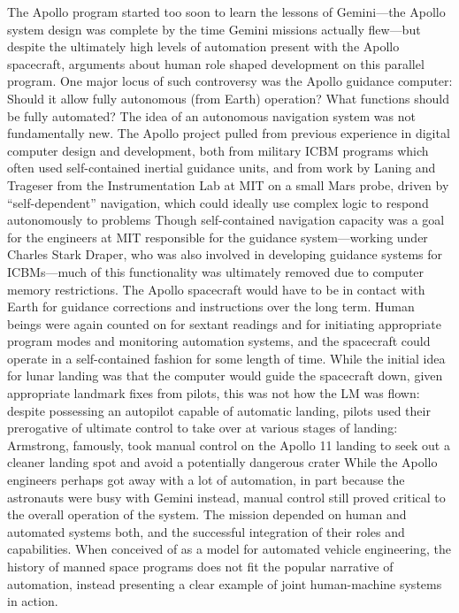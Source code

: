 The Apollo program started too soon to learn the lessons of
Gemini---the Apollo system design was complete by the time Gemini
missions actually flew\cite[p. 93]{???-DM}---but despite the
ultimately high levels of automation present with the Apollo
spacecraft, arguments about human role shaped development on this
parallel program. One major locus of such controversy was the Apollo
guidance computer: Should it allow fully autonomous (from Earth)
operation? What functions should be fully automated? The idea of an
autonomous navigation system was not fundamentally new. The Apollo
project pulled from previous experience in digital computer design and
development, both from military ICBM programs which often used
self-contained inertial guidance units, and from work by Laning and
Trageser from the Instrumentation Lab at MIT on a small Mars probe,
driven by ``self-dependent'' navigation, which could ideally use
complex logic to respond autonomously to problems\cite[p.
  99-100]{???-DM} Though self-contained navigation capacity was a goal
for the engineers at MIT responsible for the guidance system---working
under Charles Stark Draper, who was also involved in developing
guidance systems for ICBMs---much of this functionality was ultimately
removed due to computer memory restrictions\cite{???}. The Apollo
spacecraft would have to be in contact with Earth for guidance
corrections and instructions over the long term. Human beings were
again counted on for sextant readings and for initiating appropriate
program modes and monitoring automation systems, and the spacecraft
could operate in a self-contained fashion for some length of
time\cite{???}. While the initial idea for lunar landing was that the
computer would guide the spacecraft down, given appropriate landmark
fixes from pilots, this was not how the LM was flown: despite
possessing an autopilot capable of automatic landing, pilots used
their prerogative of ultimate control to take over at various stages
of landing: Armstrong, famously, took manual control on the Apollo 11
landing to seek out a cleaner landing spot and avoid a potentially
dangerous crater\cite[p. 3]{???-DM} While the Apollo engineers perhaps
got away with a lot of automation, in part because the astronauts were
busy with Gemini instead, manual control still proved critical to the
overall operation of the system. The mission depended on human and
automated systems both, and the successful integration of their roles
and capabilities. When conceived of as a model for automated vehicle
engineering, the history of manned space programs does not fit the
popular narrative of automation, instead presenting a clear example of
joint human-machine systems in action.

